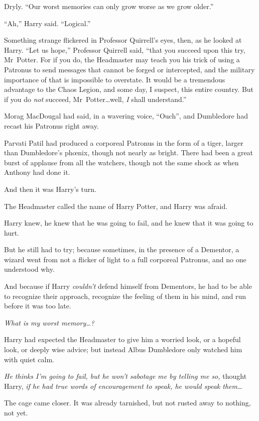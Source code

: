 Dryly. “Our worst memories can only grow worse as we grow older.”

“Ah,” Harry said. “Logical.”

Something strange flickered in Professor Quirrell’s eyes, then, as he looked at Harry. “Let us hope,” Professor Quirrell said, “that you succeed upon this try, Mr~Potter. For if you do, the Headmaster may teach you his trick of using a Patronus to send messages that cannot be forged or intercepted, and the military importance of that is impossible to overstate. It would be a tremendous advantage to the Chaos Legion, and some day, I suspect, this entire country. But if you do \emph{not} succeed, Mr~Potter…well, \emph{I} shall understand.”

\later

Morag MacDougal had said, in a wavering voice, “Ouch”, and Dumbledore had recast his Patronus right away.

Parvati Patil had produced a corporeal Patronus in the form of a tiger, larger than Dumbledore’s phœnix, though not nearly as bright. There had been a great burst of applause from all the watchers, though not the same shock as when Anthony had done it.

And then it was Harry’s turn.

The Headmaster called the name of Harry Potter, and Harry was afraid.

Harry knew, he knew that he was going to fail, and he knew that it was going to hurt.

But he still had to try; because sometimes, in the presence of a Dementor, a wizard went from not a flicker of light to a full corporeal Patronus, and no one understood why.

And because if Harry \emph{couldn’t} defend himself from Dementors, he had to be able to recognize their approach, recognize the feeling of them in his mind, and run before it was too late.

\emph{What is my worst memory…?}

Harry had expected the Headmaster to give him a worried look, or a hopeful look, or deeply wise advice; but instead Albus Dumbledore only watched him with quiet calm.

\emph{He thinks I’m going to fail, but he won’t sabotage me by telling me so,} thought Harry, \emph{if he had true words of encouragement to speak, he would speak them…}

The cage came closer. It was already tarnished, but not rusted away to nothing, not yet.

